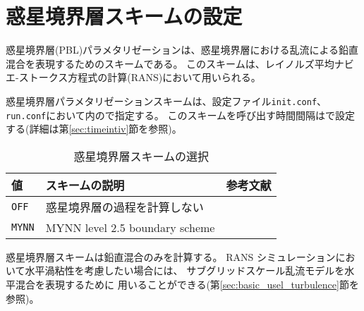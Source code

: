 
\section{惑星境界層スキームの設定} \label{sec:basic_usel_pbl}

惑星境界層(PBL)パラメタリゼーションは、惑星境界層における乱流による鉛直混合を表現するためのスキームである。
このスキームは、レイノルズ平均ナビエ-ストークス方程式の計算(RANS)において用いられる。

惑星境界層パラメタリゼーションスキームは、設定ファイル\verb|init.conf|、\verb|run.conf|において内ので指定する。
このスキームを呼び出す時間間隔はで設定する(詳細は第\ref{sec:timeintiv}節を参照)。

\begin{table}[h]
\begin{center}
  \caption{惑星境界層スキームの選択}
  \label{tab:nml_atm_bl}
  \begin{tabularx}{150mm}{lXX} \hline
    \rowcolor[gray]{0.9}  値 & スキームの説明 & 参考文献\\ \hline
      \verb|OFF|          & 惑星境界層の過程を計算しない &  \\
      \verb|MYNN|         & MYNN level 2.5 boundary scheme & \citet{my_1982,nakanishi_2004} \\
    \hline
  \end{tabularx}
\end{center}
\end{table}

惑星境界層スキームは鉛直混合のみを計算する。
RANS シミュレーションにおいて水平渦粘性を考慮したい場合には、
サブグリッドスケール乱流モデルを水平混合を表現するために
用いることができる(第\ref{sec:basic_usel_turbulence}節を参照)。
